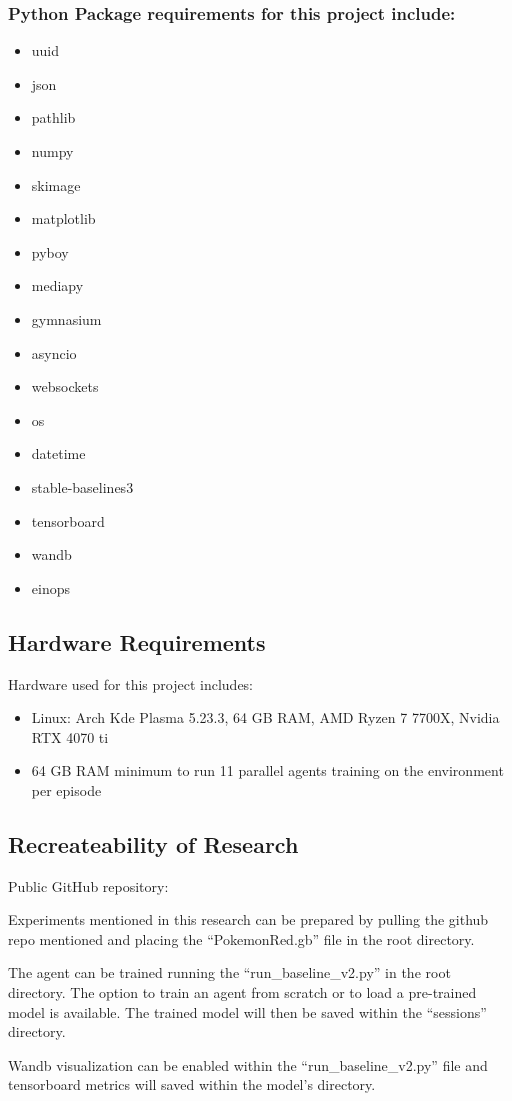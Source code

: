 \subsubsection*{Python Package requirements for this project include: }

\begin{multicols}{2}
\begin{itemize}
    \item uuid
    \item json
    \item pathlib
    \item numpy
    \item skimage
    \item matplotlib
    \item pyboy
    \item mediapy
    \item gymnasium
    \item asyncio
    \item websockets
    \item os
    \item datetime
    \item stable-baselines3
    \item tensorboard
    \item wandb
    \item einops
\end{itemize}
\end{multicols}

\subsection{Hardware Requirements}\label{subsec:Hardware}

Hardware used for this project includes:
\begin{itemize}
    \item Linux: Arch Kde Plasma 5.23.3, 64 GB RAM, AMD Ryzen 7 7700X, Nvidia RTX 4070 ti
    \item 64 GB RAM minimum to run 11 parallel agents training on the environment per episode

\end{itemize}

\subsection{Recreateability of Research}

Public GitHub repository: \url{}

Experiments mentioned in this research can be prepared by pulling the github repo mentioned and placing the ``PokemonRed.gb'' file in the root directory. 

The agent can be trained running the ``run\_baseline\_v2.py'' in the root directory. The option to train an agent from scratch or to load a pre-trained model is available. The trained model will then be saved within the ``sessions'' directory.

Wandb visualization can be enabled within the ``run\_baseline\_v2.py'' file and tensorboard metrics will saved within the model's directory.